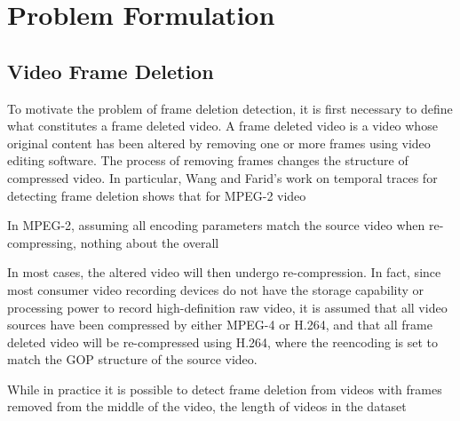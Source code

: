 \chapter{Problem Formulation}



\section{Video Frame Deletion}

To motivate the problem of frame deletion detection, it is first necessary to define what constitutes a frame deleted video. A frame deleted video is a video whose original content has been altered by removing one or more frames using video editing software. The process of removing frames changes the structure of compressed video. In particular, Wang and Farid's work on temporal traces for detecting frame deletion shows that for MPEG-2 video

In MPEG-2, assuming all encoding parameters match the source video when re-compressing, nothing about the overall

In most cases, the altered video will then undergo re-compression. In fact, since most consumer video recording devices do not have the storage capability or processing power to record high-definition raw video, it is assumed that all video sources have been compressed by either MPEG-4 or H.264, and that all frame deleted video will be re-compressed using H.264, where the reencoding is set to match the GOP structure of the source video.

While in practice it is possible to detect frame deletion from videos with frames removed from the middle of the video, the length of videos in the dataset